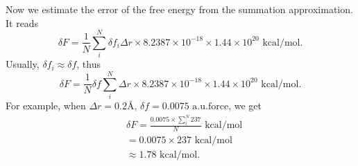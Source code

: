 Now we estimate the error of the free energy from the summation approximation. It reads
\begin{equation}
\delta{F} = \frac{1}{N}\sum_{i}^{N}\delta{f_i}{\Delta{r}}\times 8.2387\times10^{-18}\times1.44\times10^{20}\text{ kcal/mol}.
\label{eq:dleta_f}
\end{equation}
Usually, $\delta{f_i}\approx\delta{f}$, thus
\begin{equation}
\delta{F} = \frac{1}{N}\delta{f}\sum_{i}^{N}{\Delta{r}}\times 8.2387\times10^{-18}\times1.44\times10^{20}\text{ kcal/mol}.
\label{eq:dleta_f-2}
\end{equation}
For example, when $\Delta{r}= 0.2$\AA, $\delta{f}=0.0075 \text{ a.u.force}$, we get
\begin{equation}
\begin{split}
&\delta{F} = \frac{0.0075\times\sum_{i}^{N}237}{N}\text{ kcal/mol}\\
&          = 0.0075\times237\text{ kcal/mol}\\
&          \approx 1.78\text{ kcal/mol}.
\end{split}
\label{eq:dleta_f-3}
\end{equation}
